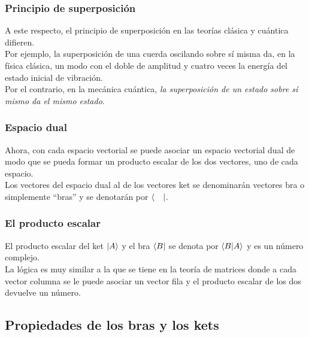 \documentclass[12pt]{beamer}
\begin{document}
\begin{frame}
\frametitle{Principio de superposición}
A este respecto, el principio de superposición en las teorías clásica y cuántica difieren.
\\
\bigskip
\pause
Por ejemplo, la superposición de una cuerda oscilando sobre sí misma da, en la física clásica, un modo con el doble de amplitud y cuatro veces la energía del estado inicial de vibración.
\\
\bigskip
\pause
Por el contrario, en la mecánica cuántica, \emph{la superposición de un estado sobre sí mismo da el mismo estado}.
\end{frame}
\begin{frame}
\frametitle{Espacio dual}
Ahora, con cada espacio vectorial se puede asociar un espacio vectorial dual de modo que se pueda formar un producto escalar de los dos vectores, uno de cada espacio.
\\
\bigskip
\pause
Los vectores del espacio dual al de los vectores ket se denominarán vectores bra o simplemente \enquote{bras} y se denotarán por $\bra{ \quad }$.
\end{frame}
\begin{frame}
\frametitle{El producto escalar}
El producto escalar del ket $\ket{A}$ y el bra $\bra{B}$ se denota por $\braket{B}{A}$ y es un número complejo.
\\
\bigskip
\pause
La lógica es muy similar a la que se tiene en la teoría de matrices donde a cada vector columna se le puede asociar un vector fila y el producto escalar de los dos devuelve un número.
\end{frame}

\subsection{Propiedades de los bras y los kets}
\end{document}
